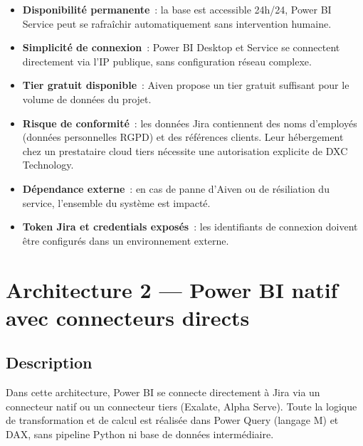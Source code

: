 \documentclass[12pt, a4paper]{article}
\begin{document}
\begin{orangebox}
\begin{itemize}[leftmargin=1.5em, itemsep=3pt]
  \item[\textcolor{greenborder}{+}] \textbf{Disponibilité permanente}~: la base est
        accessible 24h/24, Power BI Service peut se rafraîchir automatiquement sans
        intervention humaine.
  \item[\textcolor{greenborder}{+}] \textbf{Simplicité de connexion}~: Power BI
        Desktop et Service se connectent directement via l'IP publique, sans
        configuration réseau complexe.
  \item[\textcolor{greenborder}{+}] \textbf{Tier gratuit disponible}~: Aiven propose
        un tier gratuit suffisant pour le volume de données du projet.
  \item[\textcolor{redborder}{--}] \textbf{Risque de conformité}~: les données Jira
        contiennent des noms d'employés (données personnelles RGPD) et des références
        clients. Leur hébergement chez un prestataire cloud tiers nécessite une
        autorisation explicite de DXC Technology.
  \item[\textcolor{redborder}{--}] \textbf{Dépendance externe}~: en cas de panne
        d'Aiven ou de résiliation du service, l'ensemble du système est impacté.
  \item[\textcolor{redborder}{--}] \textbf{Token Jira et credentials exposés}~: les
        identifiants de connexion doivent être configurés dans un environnement externe.
\end{itemize}
\end{orangebox}

\section{Architecture 2 — Power BI natif avec connecteurs directs}

\subsection{Description}

Dans cette architecture, Power BI se connecte directement à Jira via un connecteur
natif ou un connecteur tiers (Exalate, Alpha Serve). Toute la logique de transformation
et de calcul est réalisée dans Power Query (langage M) et DAX, sans pipeline Python
ni base de données intermédiaire.
\end{document}
